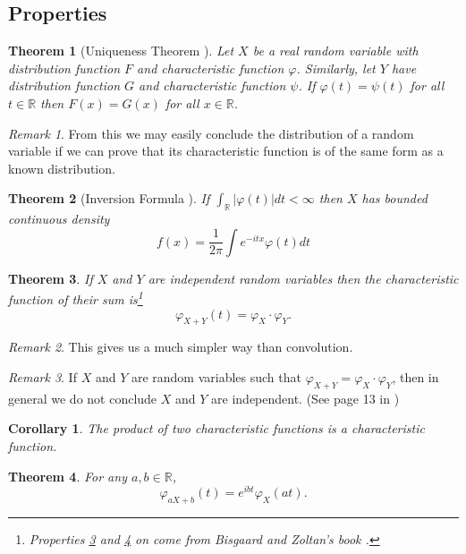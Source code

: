 \documentclass{article}
\theoremstyle{definition}
\theoremstyle{plain}
\newtheorem{theorem}{Theorem}[section]
\newtheorem{corollary}{Corollary}[theorem]
\theoremstyle{remark}
\newtheorem*{remark}{Remark}
\newcommand{\reals}{\mathbb{R}}
\begin{document}
\subsection{Properties}
\begin{theorem}[Uniqueness Theorem \cite{uChicago}]
	Let $X$ be a real random variable with distribution function
	$F$ and characteristic function $\varphi$. Similarly, let $Y$ have distribution
	function $G$ and characteristic function $\psi$. If $\varphi(t) = \psi(t)$ for all $t\in\reals$
	then $F(x) = G(x)$ for all $x \in\reals$.
\end{theorem}
\begin{remark}
	From this we may easily conclude the distribution of a random variable if we can prove that its characteristic function is of the same form as a known distribution.
\end{remark}
\begin{theorem}[Inversion Formula \cite{pte}]
If $\int_\reals |\varphi(t)| dt < \infty$ then $X$ has bounded continuous density
$$
f(x) = \frac1{2\pi} \int e^{-itx}\varphi(t)dt
$$

\end{theorem}
\begin{theorem}
	If $X$ and $Y$ are independent random variables then the characteristic function of their sum is\footnote{Properties \ref{thm:indept} and \ref{thm:linear} on come from Bisgaard and Zoltan's book \cite{cfms}.} 
	$$\varphi_{X+Y}(t) = \varphi_{X}\cdot\varphi_{Y}.$$
	\label{thm:indept}
\end{theorem}
\begin{remark}
This gives us a much simpler way than convolution.
\end{remark} 
\begin{remark}
If $X$ and $Y$ are random variables such that $\varphi_{X+Y} = \varphi_X\cdot\varphi_Y $, then in general we do not conclude $X$ and $Y$ are independent. (See page 13 in \cite{cfms})
\end{remark} 
\begin{corollary}
	The product of two characteristic functions is a characteristic function.
\end{corollary}
\begin{theorem}
	For any $a,b \in \reals$, $$\varphi_{aX+b}(t)=e^{ibt}\varphi_X(at).$$
	\label{thm:linear}
\end{theorem}
\end{document}
